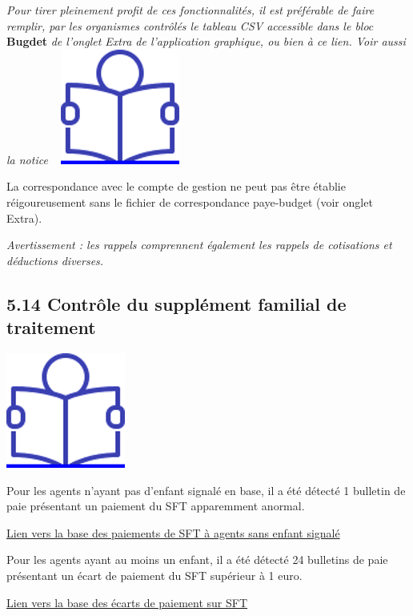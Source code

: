 \emph{Pour tirer pleinement profit de ces fonctionnalités, il est
préférable de faire remplir, par les organismes contrôlés le tableau CSV
accessible dans le bloc} \textbf{Bugdet} \emph{de l'onglet Extra de
l'application graphique, ou bien à ce lien. Voir aussi la notice} ~
\href{../Docs/Notices/fiche_tableau_budget.odt}{\includegraphics{icones/Notice.png}}

La correspondance avec le compte de gestion ne peut pas être établie
réigoureusement sans le fichier de correspondance paye-budget (voir
onglet Extra).

\emph{Avertissement : les rappels comprennent également les rappels de
cotisations et déductions diverses.}

\hypertarget{controle-du-supplement-familial-de-traitement}{%
\subsection{5.14 Contrôle du supplément familial de
traitement}\label{controle-du-supplement-familial-de-traitement}}

\href{../Docs/Notices/fiche_SFT.odt}{\includegraphics{icones/Notice.png}}

Pour les agents n'ayant pas d'enfant signalé en base, il a été détecté 1
bulletin de paie présentant un paiement du SFT apparemment anormal.

\href{../Bases/Reglementation/Paie.sans.enfant.reduit.csv}{Lien vers la
base des paiements de SFT à agents sans enfant signalé}

Pour les agents ayant au moins un enfant, il a été détecté 24 bulletins
de paie présentant un écart de paiement du SFT supérieur à 1 euro.

\href{../Bases/Reglementation/controle.sft.csv}{Lien vers la base des
écarts de paiement sur SFT}

